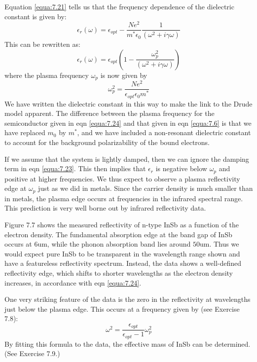 \documentclass[12pt]{book}
\def\um{\mathrm{um}}
\begin{document}
{Equation \ref{equa:7.21} tells us that the frequency dependence of the dielectric constant is given by:
\begin{equation}\label{equa:7.22}
  \epsilon_r(\omega)=\epsilon_{opt}-\frac{Ne^2}{m^*\epsilon_0}\frac{1}{(\omega^2+i\gamma\omega)}
\end{equation}
This can be rewritten as:
\begin{equation}\label{equa:7.23}
  \epsilon_r(\omega)=\epsilon_{opt}\left(1-\frac{\omega_p^2}{(\omega^2+i\gamma\omega)}\right)
\end{equation}
where the plasma frequency $\omega_p$ is now given by
\begin{equation}\label{equa:7.24}
  \omega_p^2=\frac{Ne^2}{\epsilon_{opt}\epsilon_0m^*}
\end{equation}
We have written the dielectric constant in this way to make the link to the Drude model apparent. The difference between the plasma frequency for the semiconductor given in eqn \ref{equa:7.24} and that given in eqn \ref{equa:7.6} is that we have replaced $m_0$ by $m^*$, and we have included a non-resonant dielectric constant to account for the background polarizability of the bound electrons.

If we assume that the system is lightly damped, then we can ignore the damping term in eqn \ref{equa:7.23}. This then implies that $\epsilon_r$ is negative below $\omega_p$ and positive at higher frequencies. We thus expect to observe a plasma reflectivity edge at $\omega_p$ just as we did in metals. Since the carrier density is much smaller than in metals, the plasma edge occurs at frequencies in the infrared spectral range. This prediction is very well borne out by infrared reflectivity data.

Figure 7.7 shows the measured reflectivity of n-type InSb as a function of the electron density. The fundamental absorption edge at the band gap of InSb occurs at $6\um$, while the phonon absorption band lies around $50\um$. Thus we would expect pure InSb to be transparent in the wavelength range shown and have a featureless reflectivity spectrum. Instead, the data shows a well-defined reflectivity edge, which shifts to shorter wavelengths as the electron density increases, in accordance with eqn \ref{equa:7.24}.

One very striking feature of the data is the zero in the reflectivity at wavelengths just below the plasma edge. This occurs at a frequency given by (see Exercise 7.8):
\begin{equation}\label{equa:7.25}
  \omega^2=\frac{\epsilon_{opt}}{\epsilon_{opt}-1}\omega_p^2
\end{equation}
By fitting this formula to the data, the effective mass of InSb can be determined. (See Exercise 7.9.)

}
\end{document}
